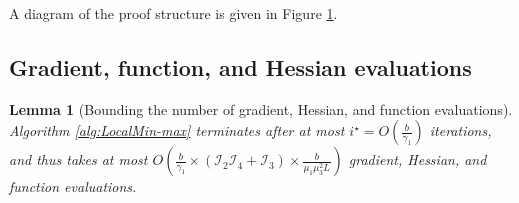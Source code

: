 \documentclass[11pt,letterpaper]{article}
\renewcommand{\epsilon}{\varepsilon}
\newtheorem{lemma}[theorem]{Lemma}
\begin{document}
     A diagram of the proof structure is given in Figure \ref{fig:proof_diagram}.  

\begin{figure}[omitted: a diagram of this paper's results, not reproduced here]\label{fig:proof_diagram}\end{figure}

\newpage

\subsection{Gradient, function, and Hessian evaluations} 

\begin{lemma}[{Bounding the number of gradient, Hessian, and function evaluations}] \label{lemma:RunningTime} 
%
Algorithm \ref{alg:LocalMin-max} terminates after at most  $i^\star = O\left(\frac{b}{\gamma_1}\right)$ iterations, and thus takes at most $O\left(\frac{b}{\gamma_1}  \times  (\mathcal{I}_2 \mathcal{I}_4+ \mathcal{I}_3) \times \frac{b}{ \mu_1 \mu_3^2 L_{}}\right)$ gradient, Hessian, and function evaluations. 
\end{lemma}
\end{document}
